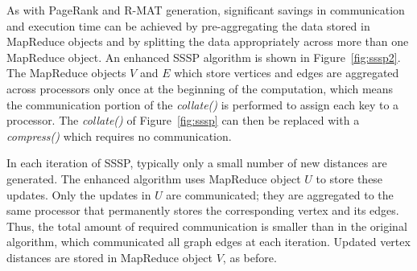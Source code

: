 As with PageRank and R-MAT generation, significant savings in
communication and execution time can be achieved by pre-aggregating
the data stored in MapReduce objects and by splitting the data
appropriately across more than one MapReduce object.  An enhanced SSSP
algorithm is shown in Figure~\ref{fig:sssp2}.  The MapReduce objects
$V$ and $E$ which store vertices and edges are aggregated across
processors only once at the beginning of the computation, which means
the communication portion of the {\it collate()} is performed to
assign each key to a processor.  The {\it collate()} of
Figure~\ref{fig:sssp} can then be replaced with a {\it compress()}
which requires no communication.

In each iteration of SSSP, typically only a small number of new
distances are generated.  The enhanced algorithm uses MapReduce object
$U$ to store these updates.  Only the updates in $U$ are communicated;
they are aggregated to the same processor that permanently stores
the corresponding vertex and its edges.  Thus, the total amount of
required communication is smaller than in the original algorithm,
which communicated all graph edges at each iteration.  Updated vertex
distances are stored in MapReduce object $V$, as before.

